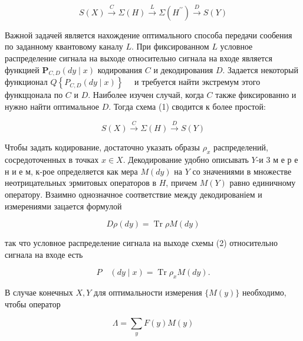 \documentclass[10pt]{article}
\begin{document}
\[

S(X) \stackrel{C}{\longrightarrow} \Sigma(H) \stackrel{L}{\longrightarrow} \Sigma\left(H^{\prime \prime}\right) \stackrel{D}{\longrightarrow} S(Y)

\]



Важной задачей является нахождение оптимального способа передачи сообения по заданному квантовому каналу $L$. При фиксированном $L$ условное распределение сигнала на выходе относительно сигнала на входе является функцией $\boldsymbol{P}_{C, D}(d y \mid x)$ кодирования $C$ и декодирования $D$. Задается некоторый функционал $Q\left\{P_{C, D}(d y \mid x)\right\} \quad$ и требуется найти экстремум этого функццонала по $C$ и $D$. Наиболее изучен случай, когда $C$ также фиксированно и нужно найти оптимальное $D$. Тогда схема (1) сводится к более простой:



\[

S(X) \stackrel{C}{\longrightarrow} \Sigma(H) \stackrel{D}{\longrightarrow} S(Y)

\]



Чтобы задать кодирование, достаточно указать образы $\rho_{x}$ распределений, сосредоточенных в точках $x \in X$. Декодирование удобно описывать $Y$-и 3 м е р е н и е м, к-рое определяется как мера $M(d y)$ на $Y$ со значениями в множестве неотрицательных эрмитовых операторов в $H$, причем $M(Y)$ равно единичному оператору. Взаимно однозначное соответствие между декодированіем и измерениями зацается формулой



\[

D \rho(d y)=\operatorname{Tr} \rho M(d y)

\]



так что условное распределение сигнала на выходе схемы (2) относительно сигнала на входе есть



\[

P \quad(d y \mid x)=\operatorname{Tr} \rho_{x} M(d y) .

\]



В случае конечных $X, Y$ для оптимальности измерения $\{M(y)\}$ необходимо, чтобы оператор



\[

\Lambda=\sum_{y} F(y) M(y)

\]
\end{document}
